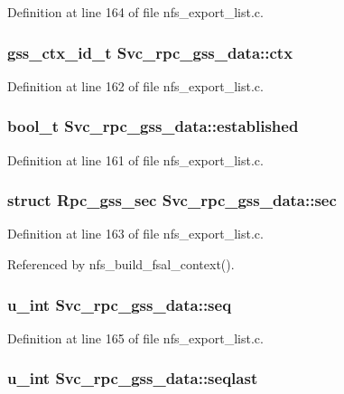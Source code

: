 Definition at line 164 of file nfs\_\-export\_\-list.c.
\subsubsection{\setlength{\rightskip}{0pt plus 5cm}gss\_\-ctx\_\-id\_\-t {\bf Svc\_\-rpc\_\-gss\_\-data::ctx}}\label{structSvc__rpc__gss__data_o1}




Definition at line 162 of file nfs\_\-export\_\-list.c.
\subsubsection{\setlength{\rightskip}{0pt plus 5cm}bool\_\-t {\bf Svc\_\-rpc\_\-gss\_\-data::established}}\label{structSvc__rpc__gss__data_o0}




Definition at line 161 of file nfs\_\-export\_\-list.c.
\subsubsection{\setlength{\rightskip}{0pt plus 5cm}struct Rpc\_\-gss\_\-sec {\bf Svc\_\-rpc\_\-gss\_\-data::sec}}\label{structSvc__rpc__gss__data_o2}




Definition at line 163 of file nfs\_\-export\_\-list.c.

Referenced by nfs\_\-build\_\-fsal\_\-context().
\subsubsection{\setlength{\rightskip}{0pt plus 5cm}u\_\-int {\bf Svc\_\-rpc\_\-gss\_\-data::seq}}\label{structSvc__rpc__gss__data_o4}




Definition at line 165 of file nfs\_\-export\_\-list.c.
\subsubsection{\setlength{\rightskip}{0pt plus 5cm}u\_\-int {\bf Svc\_\-rpc\_\-gss\_\-data::seqlast}}\label{structSvc__rpc__gss__data_o6}




